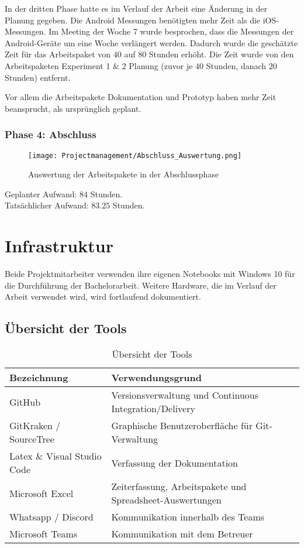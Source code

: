 In der dritten Phase hatte es im Verlauf der Arbeit eine Änderung in der Planung 
gegeben. Die Android Messungen benötigten mehr Zeit als die iOS-Messungen. 
Im Meeting der Woche 7 wurde besprochen, dass die Messungen der Android-Geräte 
um eine Woche verlängert werden. Dadurch wurde die geschätzte Zeit für das 
Arbeitspaket von $40$ auf $80$ Stunden erhöht. Die Zeit wurde von den 
Arbeitspaketen Experiment 1 \& 2 Planung 
(zuvor je $40$ Stunden, danach $20$ Stunden) entfernt.

Vor allem die Arbeitspakete Dokumentation und Prototyp haben mehr Zeit 
beansprucht, als ursprünglich geplant. 

\clearpage 

\subsubsection*{Phase 4: Abschluss}
\begin{figure}[h!]
	\centering
	\texttt{[image: Projectmanagement/Abschluss\_Auswertung.png]}
	\caption{Auswertung der Arbeitspakete in der Abschlussphase
	\label{figure:finishevaluation}}
\end{figure}

Geplanter Aufwand: $84$ Stunden. \\
Tatsächlicher Aufwand: $83.25$ Stunden.

\clearpage

\section{Infrastruktur 
\label{Infrastruktur}}
Beide Projektmitarbeiter verwenden ihre eigenen Notebooks mit Windows 10 
für die Durchführung der Bachelorarbeit. 
Weitere Hardware, die im Verlauf der Arbeit verwendet wird, 
wird fortlaufend dokumentiert.

\subsection*{Übersicht der Tools}
\begin{table}[H]
	\centering
	\begin{tabularx}{\linewidth}{l X}
		\toprule 
		\textbf{Bezeichnung} & \textbf{Verwendungsgrund} \\
		\midrule
		GitHub & Versionsverwaltung und Continuous Integration/Delivery \\
		GitKraken / SourceTree & Graphische Benutzeroberfläche für Git-Verwaltung \\
		Latex \& Visual Studio Code & Verfassung der Dokumentation \\
		Microsoft Excel & Zeiterfassung, Arbeitspakete und Spreadsheet-Auswertungen \\
		Whatsapp / Discord & Kommunikation innerhalb des Teams \\
		Microsoft Teams & Kommunikation mit dem Betreuer \\
		\bottomrule 
	\end{tabularx} 
	\caption{Übersicht der Tools
	\label{table:UebersichtTools}} 
\end{table}

